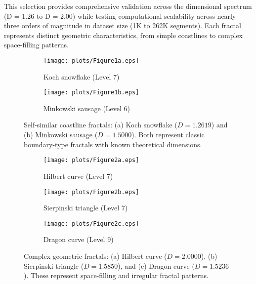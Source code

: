 \documentclass[preprint,12pt]{elsarticle}
\begin{document}
This selection provides comprehensive validation across the dimensional spectrum (D = 1.26 to D = 2.00) while testing computational scalability across nearly three orders of magnitude in dataset size (1K to 262K segments). Each fractal represents distinct geometric characteristics, from simple coastlines to complex space-filling patterns.

\begin{figure}[H]
\centering
\begin{subfigure}[b]{0.48\textwidth}
    \centering
    \texttt{[image: plots/Figure1a.eps]}
    \caption{Koch snowflake (Level 7)}
    \label{fig:koch_fractal}
\end{subfigure}
\hfill
\begin{subfigure}[b]{0.48\textwidth}
    \centering
    \texttt{[image: plots/Figure1b.eps]}
    \caption{Minkowski sausage (Level 6)}
    \label{fig:minkowski_fractal}
\end{subfigure}
\caption{Self-similar coastline fractals: (a) Koch snowflake ($D = 1.2619$) and (b) Minkowski sausage ($D = 1.5000$). Both represent classic boundary-type fractals with known theoretical dimensions.}
\label{fig:coastline_fractals}
\end{figure}

\begin{figure}[H]
\centering
\begin{subfigure}[b]{0.45\textwidth}
    \centering
    \texttt{[image: plots/Figure2a.eps]}
    \caption{Hilbert curve (Level 7)}
    \label{fig:hilbert_fractal}
\end{subfigure}
\hfill
\begin{subfigure}[b]{0.45\textwidth}
    \centering
    \texttt{[image: plots/Figure2b.eps]}
    \caption{Sierpinski triangle (Level 7)}
    \label{fig:sierpinski_fractal}
\end{subfigure}

\vspace{0.4cm}

\begin{subfigure}[b]{0.4\textwidth}
    \centering
    \texttt{[image: plots/Figure2c.eps]}
    \caption{Dragon curve (Level 9)}
    \label{fig:dragon_fractal}
\end{subfigure}

\caption{Complex geometric fractals: (a) Hilbert curve ($D = 2.0000$), (b) Sierpinski triangle ($D = 1.5850$), and (c) Dragon curve ($D = 1.5236$). These represent space-filling and irregular fractal patterns.}
\label{fig:complex_fractals}
\end{figure}
\end{document}
